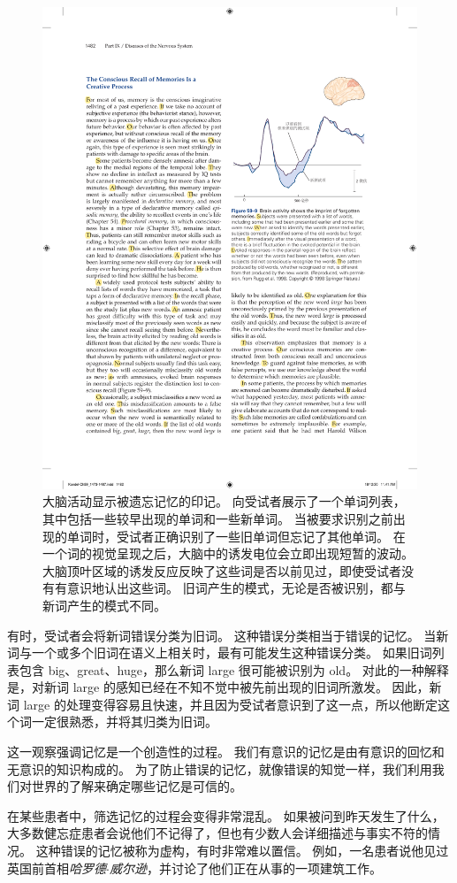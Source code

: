 \begin{figure}[htbp]
	\centering
	\includegraphics[width=0.65\linewidth]{chap59/fig_59_9}
	\caption{大脑活动显示被遗忘记忆的印记。
		向受试者展示了一个单词列表，其中包括一些较早出现的单词和一些新单词。
		当被要求识别之前出现的单词时，受试者正确识别了一些旧单词但忘记了其他单词。
		在一个词的视觉呈现之后，大脑中的诱发电位会立即出现短暂的波动。
		大脑顶叶区域的诱发反应反映了这些词是否以前见过，即使受试者没有有意识地认出这些词。
		旧词产生的模式，无论是否被识别，都与新词产生的模式不同\cite{rugg1998dissociation}。}
	\label{fig:59_9}
\end{figure}


有时，受试者会将新词错误分类为旧词。
这种错误分类相当于错误的记忆。
当新词与一个或多个旧词在语义上相关时，最有可能发生这种错误分类。
如果旧词列表包含 big、great、huge，那么新词 large 很可能被识别为 old。
对此的一种解释是，对新词 large 的感知已经在不知不觉中被先前出现的旧词所激发。
因此，新词 large 的处理变得容易且快速，并且因为受试者意识到了这一点，所以他断定这个词一定很熟悉，并将其归类为旧词。


这一观察强调记忆是一个创造性的过程。
我们有意识的记忆是由有意识的回忆和无意识的知识构成的。
为了防止错误的记忆，就像错误的知觉一样，我们利用我们对世界的了解来确定哪些记忆是可信的。


在某些患者中，筛选记忆的过程会变得非常混乱。
如果被问到昨天发生了什么，大多数健忘症患者会说他们不记得了，但也有少数人会详细描述与事实不符的情况。
这种错误的记忆被称为虚构，有时非常难以置信。
例如，一名患者说他见过英国前首相\textit{哈罗德$\cdot$威尔逊}，并讨论了他们正在从事的一项建筑工作。


